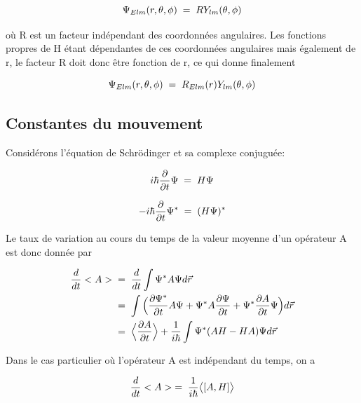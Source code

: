 \begin{equation*}
    \Psi_{Elm}(r,\theta,\phi)\; = \; R Y_{lm}(\theta,\phi)
\end{equation*}

où R est un facteur indépendant des coordonnées angulaires. Les fonctions propres de H étant dépendantes de ces coordonnées angulaires mais également de r, le facteur R doit donc être fonction de r, ce qui donne finalement

\begin{equation}
    \Psi_{Elm}(r,\theta,\phi)\; = \; R_{Elm}(r) Y_{lm}(\theta,\phi)
    \label{decompopsi}
\end{equation}

\subsection{Constantes du mouvement}

Considérons l'équation de Schrödinger et sa complexe conjuguée:

\begin{equation*}
    i \hbar \dfrac{\partial}{\partial t} \Psi \; = \; H \Psi 
\end{equation*}

\begin{equation*}
    -i \hbar \dfrac{\partial}{\partial t} \Psi ^{*}\; = \; (H \Psi)^{*} 
\end{equation*}

\vspace{0.2cm}

Le taux de variation au cours du temps de la valeur moyenne d'un opérateur A est donc donnée par

\begin{align*}
    \dfrac{d}{dt}  <A>&\; = \;\dfrac{d}{dt} \int \Psi^{*} A \Psi d\Vec{r} \\
    &\; = \; \int\Big(\dfrac{\partial\Psi^{*}}{\partial t}A \Psi + \Psi^{*} A \dfrac{\partial \Psi }{\partial t } + \Psi^{*} \dfrac{\partial A}{\partial t}\Psi \Big) d\Vec{r}\\
    &\; = \; \Big< \dfrac{\partial A}{\partial t} \Big> +\dfrac{1}{i \hbar} \int \Psi^{*} (AH-HA)\Psi d\Vec{r}
\end{align*}

Dans le cas particulier où l'opérateur A est indépendant du temps, on a 

\begin{equation*}
  \dfrac{d}{dt}<A>\; = \; \dfrac{1}{i\hbar}\big<[A,H]\big>  
\end{equation*}

